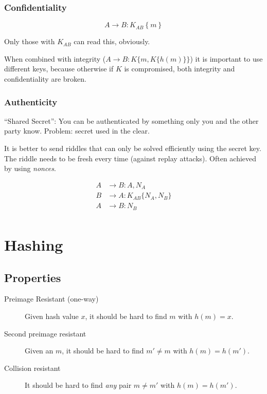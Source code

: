 \documentclass{article}
\begin{document}
\subsubsection{Confidentiality}

\[ 
  A \longrightarrow B : K_{AB}\left\{ m \right\}
\]

Only those with $K_{AB}$ can read this, obviously.

When combined with integrity ($A \longrightarrow B : K\{m, K\{h(m)\}\}$) it is
important to use different keys, because otherwise if $K$ is compromised, both integrity
and confidentiality are broken.

\subsubsection{Authenticity}

``Shared Secret'': You can be authenticated by something only you and the other
party know. Problem: secret used in the clear.

It is better to send riddles that can only be solved efficiently using the
secret key. The riddle needs to be fresh every time (against replay attacks).
Often achieved by using \emph{nonces}.

\begin{align*}
  A & \longrightarrow  B  : A, N_A             \\
  B & \longrightarrow  A : K_{AB}\{N_A, N_B\} \\
  A & \longrightarrow  B  : N_B                \\
\end{align*}

\section{Hashing}

\subsection{Properties}

\begin{description}

  \item[Preimage Resistant (one-way)] Given hash value $x$, it should be 
    hard to find $m$ with $h(m) = x$.

  \item[Second preimage resistant] Given an $m$, it should be hard to find 
    $m' \neq m$ with $h(m) = h(m')$.

  \item[Collision resistant] It should be hard to find \emph{any} pair $m \neq
    m'$ with $h(m) = h(m')$.

\end{description}
\end{document}

